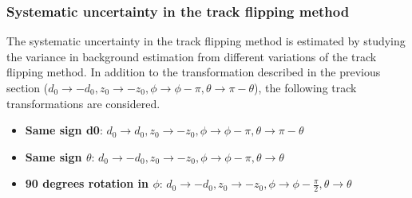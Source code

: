 \begin{table}[!htb]
  \qquad
  
  \caption{Random-crossing background by track flipping}%
  \label{table:track_flipping}
\end{table}

\subsubsection{Systematic uncertainty in the track flipping method}
\label{sec:random_crossing_systematics}

The systematic uncertainty in the track flipping method is estimated by studying the variance in background estimation from different variations of the track flipping method. In addition to the transformation described in the previous section ($d_{0}\rightarrow -d_{0}, z_{0}\rightarrow -z_{0}, \phi\rightarrow\phi-\pi, \theta\rightarrow\pi-\theta$), the following track transformations are considered.
\begin{itemize}
\item \textbf{Same sign d0}: $d_{0}\rightarrow d_{0}, z_{0}\rightarrow -z_{0}, \phi\rightarrow\phi-\pi, \theta\rightarrow\pi-\theta$
\item \textbf{Same sign $\theta$}: $d_{0}\rightarrow -d_{0}, z_{0}\rightarrow -z_{0}, \phi\rightarrow\phi-\pi, \theta\rightarrow\theta$
\item \textbf{90 degrees rotation in $\phi$}: $d_{0}\rightarrow -d_{0}, z_{0}\rightarrow -z_{0}, \phi\rightarrow\phi-\frac{\pi}{2}, \theta\rightarrow\theta$
\end{itemize}


